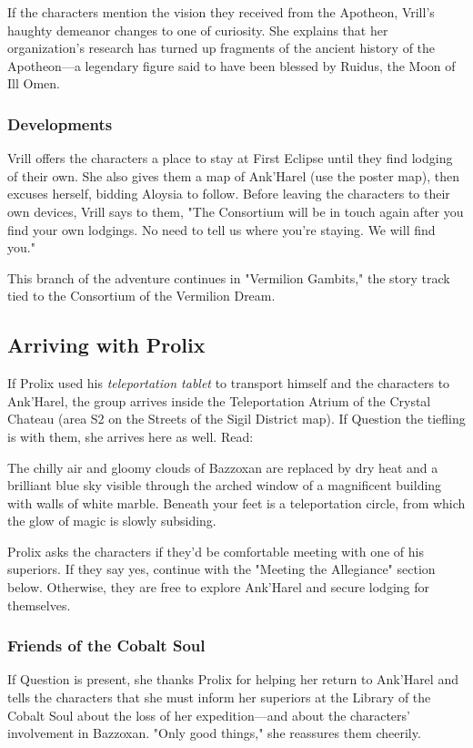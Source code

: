\documentclass[10pt,a4paper,twoside,bg=print,twocolumn,openany,nodeprecatedcode]{dndbook}
\begin{document}
If the characters mention the vision they received from the Apotheon, Vrill's haughty demeanor changes to one of curiosity. She explains that her organization's research has turned up fragments of the ancient history of the Apotheon—a legendary figure said to have been blessed by Ruidus, the Moon of Ill Omen.

\subsubsection{Developments}
Vrill offers the characters a place to stay at First Eclipse until they find lodging of their own. She also gives them a map of Ank'Harel (use the poster map), then excuses herself, bidding Aloysia to follow. Before leaving the characters to their own devices, Vrill says to them, "The Consortium will be in touch again after you find your own lodgings. No need to tell us where you're staying. We will find you."

This branch of the adventure continues in "Vermilion Gambits," the story track tied to the Consortium of the Vermilion Dream.

\subsection{Arriving with Prolix}
If Prolix used his \textit{teleportation tablet} to transport himself and the characters to Ank'Harel, the group arrives inside the Teleportation Atrium of the Crystal Chateau (area S2 on the Streets of the Sigil District map). If Question the tiefling is with them, she arrives here as well. Read:

\begin{DndReadAloud}{}
The chilly air and gloomy clouds of Bazzoxan are replaced by dry heat and a brilliant blue sky visible through the arched window of a magnificent building with walls of white marble. Beneath your feet is a teleportation circle, from which the glow of magic is slowly subsiding.

\end{DndReadAloud}

Prolix asks the characters if they'd be comfortable meeting with one of his superiors. If they say yes, continue with the "Meeting the Allegiance" section below. Otherwise, they are free to explore Ank'Harel and secure lodging for themselves.

\subsubsection{Friends of the Cobalt Soul}
If Question is present, she thanks Prolix for helping her return to Ank'Harel and tells the characters that she must inform her superiors at the Library of the Cobalt Soul about the loss of her expedition—and about the characters' involvement in Bazzoxan. "Only good things," she reassures them cheerily.
\end{document}
